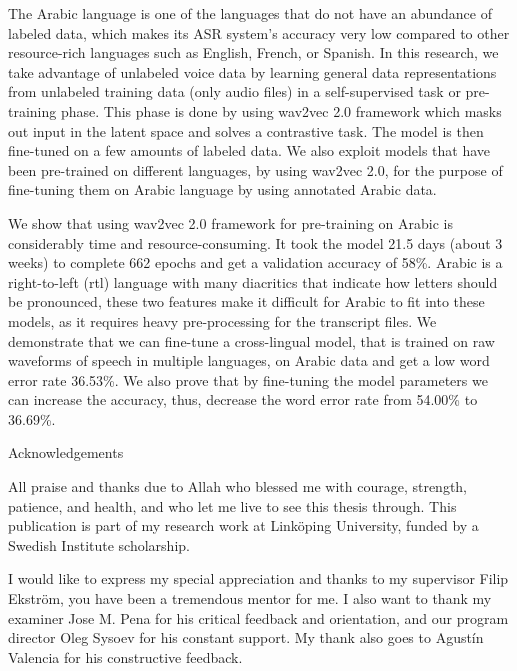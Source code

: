 \documentclass[
  a4paper,
]{article}
\begin{document}
The Arabic language is one of the languages that do not have an
abundance of labeled data, which makes its ASR system's accuracy very
low compared to other resource-rich languages such as English, French,
or Spanish. In this research, we take advantage of unlabeled voice data
by learning general data representations from unlabeled training data
(only audio files) in a self-supervised task or pre-training phase. This
phase is done by using wav2vec 2.0 framework which masks out input in
the latent space and solves a contrastive task. The model is then
fine-tuned on a few amounts of labeled data. We also exploit models that
have been pre-trained on different languages, by using wav2vec 2.0, for
the purpose of fine-tuning them on Arabic language by using annotated
Arabic data.

We show that using wav2vec 2.0 framework for pre-training on Arabic is
considerably time and resource-consuming. It took the model 21.5 days
(about 3 weeks) to complete 662 epochs and get a validation accuracy of
58\%. Arabic is a right-to-left (rtl) language with many diacritics that
indicate how letters should be pronounced, these two features make it
difficult for Arabic to fit into these models, as it requires heavy
pre-processing for the transcript files. We demonstrate that we can
fine-tune a cross-lingual model, that is trained on raw waveforms of
speech in multiple languages, on Arabic data and get a low word error
rate 36.53\%. We also prove that by fine-tuning the model parameters we
can increase the accuracy, thus, decrease the word error rate from
54.00\% to 36.69\%.

\newpage

\begin{center}

\large{Acknowledgements}

\end{center}

\bigskip
{}

All praise and thanks due to Allah who blessed me with courage,
strength, patience, and health, and who let me live to see this thesis
through. This publication is part of my research work at Linköping
University, funded by a Swedish Institute scholarship.

I would like to express my special appreciation and thanks to my
supervisor Filip Ekström, you have been a tremendous mentor for me. I
also want to thank my examiner Jose M. Pena for his critical feedback
and orientation, and our program director Oleg Sysoev for his constant
support. My thank also goes to Agustín Valencia for his constructive
feedback.
\end{document}
